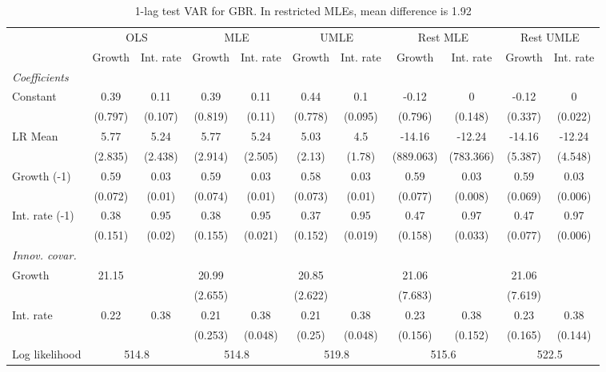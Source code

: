 \begin{table}[htbp] 
	\centering
	\begin{tabular}{@{\extracolsep{4pt}}lcccccccccc@{}}		\hline\hline
		 		 & \multicolumn{2}{c}{OLS} &\multicolumn{2}{c}{MLE} &\multicolumn{2}{c}{UMLE} &\multicolumn{2}{c}{Rest MLE} &\multicolumn{2}{c}{Rest UMLE} \\ 
 		 & Growth 	 & Int. rate 	 & Growth 	 & Int. rate 	 & Growth 	 & Int. rate 	 & Growth 	 & Int. rate 	 & Growth 	 & Int. rate\\\cline{2-3}\cline{4-5}\cline{6-7}\cline{8-9}\cline{10-11}
\rule{0pt}{4ex} 
 \emph{Coefficients} 	  		 & 		 & 		 & 		 & 		 & 		 & 		 & 		 & 		 & 		 &\\ 
\quad Constant 	 & 0.39 	 & 0.11 	 & 0.39 	 & 0.11 	 & 0.44 	 & 0.1 	 & -0.12 	 & 0 	 & -0.12 	 & 0	 \\ 
 		 & (0.797) 	 & (0.107) 	 & (0.819) 	 & (0.11) 	 & (0.778) 	 & (0.095) 	 & (0.796) 	 & (0.148) 	 & (0.337) 	 & (0.022) 	 \\ 
\quad LR Mean 	 & 5.77 	 & 5.24 	 & 5.77 	 & 5.24 	 & 5.03 	 & 4.5 	 & -14.16 	 & -12.24 	 & -14.16 	 & -12.24	 \\ 
 		 & (2.835) 	 & (2.438) 	 & (2.914) 	 & (2.505) 	 & (2.13) 	 & (1.78) 	 & (889.063) 	 & (783.366) 	 & (5.387) 	 & (4.548) 	 \\ 
\quad Growth (-1) 	 &0.59 	 & 0.03 	 & 0.59 	 & 0.03 	 & 0.58 	 & 0.03 	 & 0.59 	 & 0.03 	 & 0.59 	 & 0.03	 \\ 
 		 & (0.072) 	 & (0.01) 	 & (0.074) 	 & (0.01) 	 & (0.073) 	 & (0.01) 	 & (0.077) 	 & (0.008) 	 & (0.069) 	 & (0.006) 	 \\ 
\quad Int. rate (-1) 	 &0.38 	 & 0.95 	 & 0.38 	 & 0.95 	 & 0.37 	 & 0.95 	 & 0.47 	 & 0.97 	 & 0.47 	 & 0.97	 \\ 
 		 & (0.151) 	 & (0.02) 	 & (0.155) 	 & (0.021) 	 & (0.152) 	 & (0.019) 	 & (0.158) 	 & (0.033) 	 & (0.077) 	 & (0.006) 	 \\ 
\rule{0pt}{4ex} \emph{Innov. covar.}  	 & 	 & 	 & 	 & 	 & 	 & 	 & 	 & 	 & 	 &\\ 
\quad Growth 	 &21.15 	 &  	 & 20.99 	 &  	 & 20.85 	 &  	 & 21.06 	 &  	 & 21.06 	 & 	 \\ 
 		 &  	 &  	 & (2.655) 	 &  	 & (2.622) 	 &  	 & (7.683) 	 &  	 & (7.619) 	 &  	 \\ 
\quad Int. rate 	 &0.22 	 & 0.38 	 & 0.21 	 & 0.38 	 & 0.21 	 & 0.38 	 & 0.23 	 & 0.38 	 & 0.23 	 & 0.38	 \\ 
 		 &  	 &  	 & (0.253) 	 & (0.048) 	 & (0.25) 	 & (0.048) 	 & (0.156) 	 & (0.152) 	 & (0.165) 	 & (0.144) 	 \\ 
 \hline \rule{0pt}{4ex} 
  Log likelihood 	 &\multicolumn{2}{c}{514.8} 	 & \multicolumn{2}{c}{514.8} 	 & \multicolumn{2}{c}{519.8} 	 & \multicolumn{2}{c}{515.6} 	 & \multicolumn{2}{c}{522.5}\\ 

 \hline 	\end{tabular}		\caption{1-lag test VAR for GBR. In restricted MLEs, mean difference is 1.92}
		\label{tab:GBR1}

\end{table}